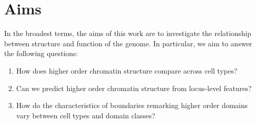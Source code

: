 \documentclass[a4paper,10pt,oneside]{book}
\begin{document}

\section{Aims}

In the broadest terms, the aims of this work are to investigate the relationship between structure and function of the genome. In particular, we aim to answer the following questions: 
\begin{enumerate}
\item How does higher order chromatin structure compare across cell types?
\item Can we predict higher order chromatin structure from locus-level features?
\item How do the characteristics of boundaries remarking higher order domains vary between cell types and domain classes?
\end{enumerate}


\ifstandalone
\begin{small}

\end{small}
\fi
\end{document}
